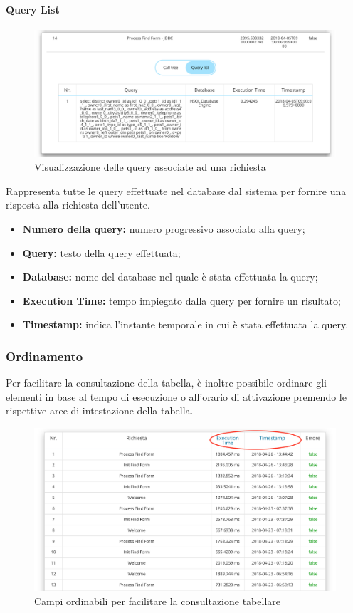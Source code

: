 \paragraph {Query List} \Spazio
\begin{figure}[H]
	\centering 
	\includegraphics[width=1\textwidth]{Images/querylist}
	\caption{Visualizzazione delle query associate ad una richiesta}
\end{figure}
Rappresenta tutte le query effettuate nel database dal sistema per fornire una risposta alla richiesta dell'utente.
    \begin{itemize}
	
	\item \textbf{Numero della query:} numero progressivo associato alla query;
	\item \textbf{Query:} testo della query effettuata;
	\item \textbf{Database:} nome del database nel quale è stata effettuata la query;
	\item \textbf{Execution Time:} tempo impiegato dalla query per fornire un risultato;
	\item \textbf{Timestamp:} indica l'instante temporale in cui è stata effettuata la query.
	
\end{itemize}

\subsubsection{Ordinamento}
\label{sec:sort}
Per facilitare la consultazione della tabella, è inoltre possibile ordinare gli elementi in base al tempo di esecuzione o all'orario di attivazione premendo le rispettive aree di intestazione della tabella.
\begin{figure}[H]
	\centering 
	\includegraphics[width=1\textwidth]{Images/sort}
	\caption{Campi ordinabili per facilitare la consultazione tabellare}
\end{figure}

